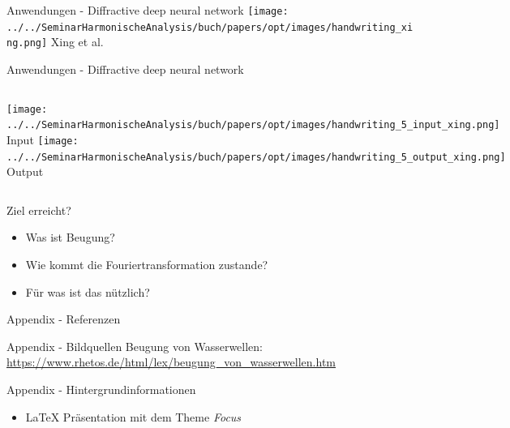 \documentclass{beamer}
\begin{document}
\begin{frame}{Anwendungen - Diffractive deep neural network}
    \centering
    \texttt{[image: ../../SeminarHarmonischeAnalysis/buch/papers/opt/images/handwriting\_xing.png]}
    Xing et al. \cite{opt:Lin.2018}
\end{frame}

\begin{frame}{Anwendungen - Diffractive deep neural network}
    \begin{columns}
        \texttt{[image: ../../SeminarHarmonischeAnalysis/buch/papers/opt/images/handwriting\_5\_input\_xing.png]}
        Input
        \texttt{[image: ../../SeminarHarmonischeAnalysis/buch/papers/opt/images/handwriting\_5\_output\_xing.png]}
        Output
    \end{columns}
\end{frame}

\begin{frame}{Ziel erreicht?}
    \begin{itemize}
        \item Was ist Beugung?
        \item Wie kommt die Fouriertransformation zustande?
        \item Für was ist das nützlich?
    \end{itemize}
\end{frame}


\appendix

\begin{frame}{Appendix - Referenzen}
    \nocite{*} %
    
    
\end{frame}

\begin{frame}{Appendix - Bildquellen}
    Beugung von Wasserwellen: \\
    \url{https://www.rhetos.de/html/lex/beugung_von_wasserwellen.htm}
\end{frame}

\begin{frame}{Appendix - Hintergrundinformationen}
    \begin{itemize}
        \item \LaTeX{} Präsentation mit dem Theme \emph{Focus}
    \end{itemize}

\end{frame}
\end{document}
